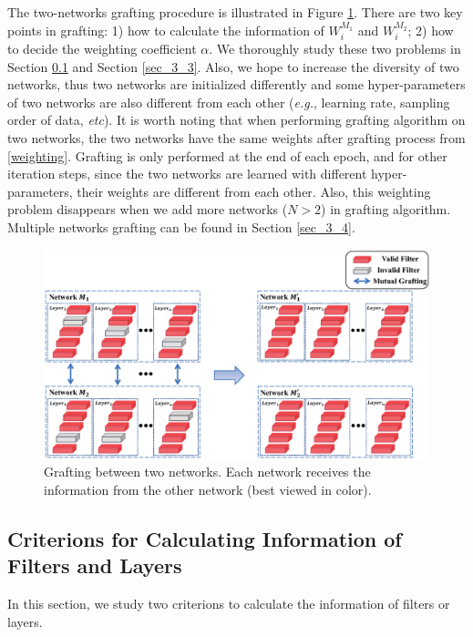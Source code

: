 \documentclass{article}
\begin{document}
The two-networks grafting procedure is illustrated in Figure \ref{figure: mutual_grafting}. There are two key points in grafting: 1) how to calculate the information of $W_{i}^{M_{1}}$ and $W_{i}^{M_{2}}$; 2) how to decide the weighting coefficient $\alpha$.
We thoroughly study these two problems in Section \ref{sec_3_2} and Section \ref{sec_3_3}. Also, we hope to increase the diversity of two networks, thus two networks are initialized differently and some hyper-parameters of two networks are also different from each other (\emph{e.g.}, learning rate, sampling order of data, \emph{etc}).  It is worth noting that when performing grafting algorithm on two networks, the two networks have the same weights after grafting process from \eqref{weighting}. Grafting is only performed at the end of each epoch, and for other iteration steps, since the two networks are learned with different hyper-parameters, their weights are different from each other. Also, this weighting problem disappears when we add more networks ($N>2$) in grafting algorithm. Multiple networks grafting can be found in Section \ref{sec_3_4}.





\begin{figure}[!h]
	\centering
	\includegraphics[width=15cm,]{fig/mutual_grafting.eps}
	\caption{Grafting between two networks. Each network receives the information from the other network (best viewed in color).}
	\label{figure: mutual_grafting}
\end{figure}




\subsection{Criterions for Calculating Information of Filters and Layers}\label{sec_3_2}		
In this section, we study two criterions to calculate the information of filters or layers.
\end{document}
